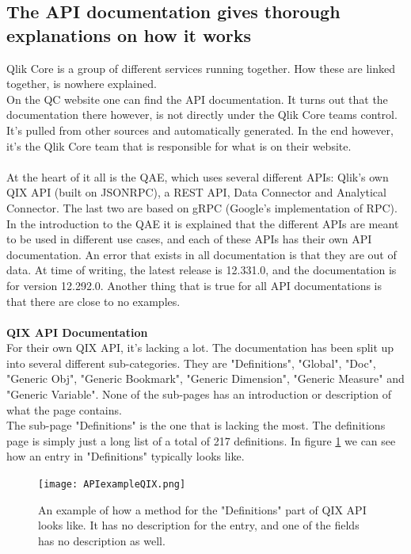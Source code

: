 \documentclass{cslthse-msc}
\begin{document}
    \subsection{The API documentation gives thorough explanations on how it works}\label{APIexplained}
    Qlik Core is a group of different services running together. How these are linked together, is nowhere explained.\\
    On the QC website one can find the API documentation. It turns out that the documentation there however, is not directly under the Qlik Core teams control. It's pulled from other sources and automatically generated. In the end however, it's the Qlik Core team that is responsible for what is on their website. \\ \\
    At the heart of it all is the QAE, which uses several different APIs: Qlik's own QIX API (built on JSONRPC), a REST API, Data Connector and Analytical Connector. The last two are based on gRPC (Google's implementation of RPC). In the introduction to the QAE it is explained that the different APIs are meant to be used in different use cases, and each of these APIs has their own API documentation. An error that exists in all documentation is that they are out of data. At time of writing, the latest release is 12.331.0, and the documentation is for version 12.292.0. Another thing that is true for all API documentations is that there are close to no examples. \\ \\
    \textbf{QIX API Documentation}\\
    For their own QIX API, it's lacking a lot. The documentation has been split up into several different sub-categories. They are "Definitions", "Global", "Doc", "Generic Obj", "Generic Bookmark", "Generic Dimension", "Generic Measure" and "Generic Variable". None of the sub-pages has an introduction or description of what the page contains. \\
    The sub-page "Definitions" is the one that is lacking the most. The definitions page is simply just a long list of a total of 217 definitions. In figure \ref{fig:qixmethod} we can see how an entry in "Definitions" typically looks like.
    \begin{figure}[H]
        \centering
        \texttt{[image: APIexampleQIX.png]}
        \caption{An example of how a method for the "Definitions" part of QIX API looks like. It has no description for the entry, and one of the fields has no description as well.}
        \label{fig:qixmethod}
    \end{figure}
\end{document}
